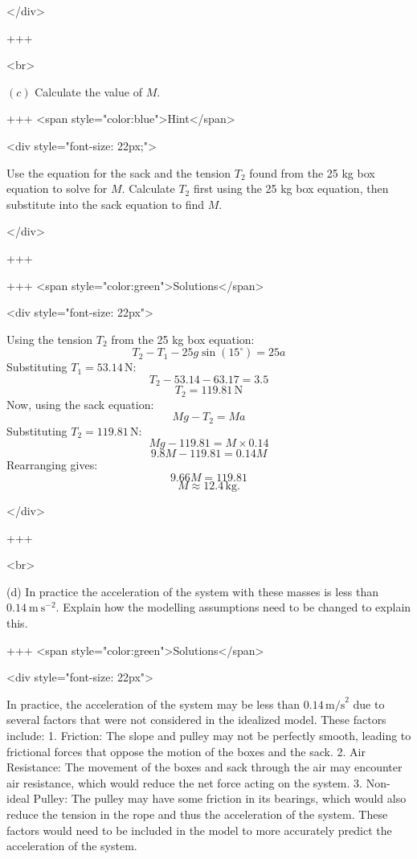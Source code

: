 </div>

+++

<br>




\((c)\) Calculate the value of $M$.

+++ <span style="color:blue">Hint</span>

<div style="font-size: 22px;">

Use the equation for the sack and the tension \(T_2\) found from the 25 kg box equation to solve for \(M\).
Calculate \(T_2\) first using the 25 kg box equation, then substitute into the sack equation to find \(M\).

</div>

+++

+++ <span style="color:green">Solutions</span>

<div style="font-size: 22px">

Using the tension \(T_2\) from the 25 kg box equation:
\[T_2 - T_1 - 25g \sin(15^\circ) = 25a\]
Substituting \(T_1 = 53.14 \, \text{N}\):
\[T_2 - 53.14 - 63.17 = 3.5\]
\[T_2 = 119.81 \, \text{N}\]
Now, using the sack equation:
\[Mg - T_2 = Ma\]
Substituting \(T_2 = 119.81 \, \text{N}\):
\[Mg - 119.81 = M \times 0.14\]
\[9.8M - 119.81 = 0.14M\]
Rearranging gives:
\[9.66M = 119.81\]
\[M \approx 12.4 \, \text{kg}.\]

</div>

+++

<br>

(d) In practice the acceleration of the system with these masses is less than $0.14 \mathrm{~m} \mathrm{~s}^{-2}$. Explain how the modelling assumptions need to be changed to explain this.

+++ <span style="color:green">Solutions</span>

<div style="font-size: 22px">

In practice, the acceleration of the system may be less than \(0.14 \, \text{m/s}^2\) due to several factors that were not considered in the idealized model. These factors include:
1. Friction: The slope and pulley may not be perfectly smooth, leading to frictional forces that oppose the motion of the boxes and the sack.
2. Air Resistance: The movement of the boxes and sack through the air may encounter air resistance, which would reduce the net force acting on the system.
3. Non-ideal Pulley: The pulley may have some  friction in its bearings, which would also reduce the tension in the rope and thus the acceleration of the system.
These factors would need to be included in the model to more accurately predict the acceleration of the system.

